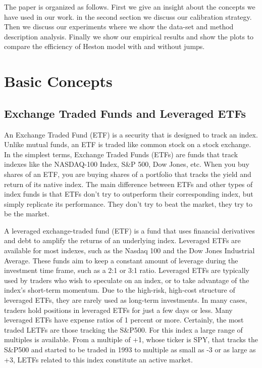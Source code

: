 \documentclass{article}
\begin{document}
The paper is organized as follows. First we give an insight about the concepts we have used in our work. in the second section we discuss our calibration strategy. Then we discuss our experiments where we show the data-set and method description analysis. Finally we show our empirical results and show the plots to compare the efficiency of Heston model with and without jumps.

\section{Basic Concepts}
\subsection{Exchange Traded Funds and Leveraged ETFs}
An Exchange Traded Fund (ETF) is a security that is designed to track an index. Unlike mutual funds, an ETF is traded like common stock on a stock exchange.\citep{ref2} In the simplest terms, Exchange Traded Funds (ETFs) are funds that track indexes like the NASDAQ-100 Index, S&P 500, Dow Jones, etc. When you buy shares of an ETF, you are buying shares of a portfolio that tracks the yield and return of its native index. The main difference between ETFs and other types of index funds is that ETFs don't try to outperform their corresponding index, but simply replicate its performance. They don't try to beat the market, they try to be the market.\citep{ref4}
\newlin\newline


A leveraged exchange-traded fund (ETF) is a fund that uses financial derivatives and debt to amplify the returns of an underlying index. Leveraged ETFs are available for most indexes, such as the Nasdaq 100 and the Dow Jones Industrial Average. These funds aim to keep a constant amount of leverage during the investment time frame, such as a 2:1 or 3:1 ratio. Leveraged ETFs are typically used by traders who wish to speculate on an index, or to take advantage of the index's short-term momentum. Due to the high-risk, high-cost structure of leveraged ETFs, they are rarely used as long-term investments. In many cases, traders hold positions in leveraged ETFs for just a few days or less. Many leveraged ETFs have expense ratios of 1 percent or more.\citep{ref5}
Certainly, the most traded LETFs are those tracking the S&P500. For this index a large range of multiples is available. From a multiple of +1, whose ticker is SPY, that tracks the S&P500 and started to be traded in 1993 to multiple as small as -3 or as large as +3, LETFs related to this index constitute an active market. \citep{ref3}
\end{document}

